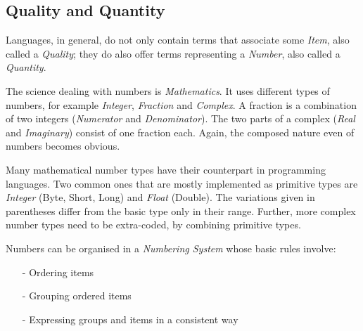 %
%
%
%
%
%
%

\subsection{Quality and Quantity}
\label{quality_and_quantity_heading}

Languages, in general, do not only contain terms that associate some
\emph{Item}, also called a \emph{Quality}; they do also offer terms
representing a \emph{Number}, also called a \emph{Quantity}.

The science dealing with numbers is \emph{Mathematics}. It uses different types
of numbers, for example \emph{Integer}, \emph{Fraction} and \emph{Complex}. A
fraction is a combination of two integers (\emph{Numerator} and \emph{Denominator}).
The two parts of a complex (\emph{Real} and \emph{Imaginary}) consist of one
fraction each. Again, the composed nature even of numbers becomes obvious.

Many mathematical number types have their counterpart in programming languages.
Two common ones that are mostly implemented as primitive types are \emph{Integer}
(Byte, Short, Long) and \emph{Float} (Double). The variations given in
parentheses differ from the basic type only in their range. Further, more
complex number types need to be extra-coded, by combining primitive types.

Numbers can be organised in a \emph{Numbering System} whose basic rules involve:

\begin{itemize}
    \item[-] Ordering items
    \item[-] Grouping ordered items
    \item[-] Expressing groups and items in a consistent way
\end{itemize}

